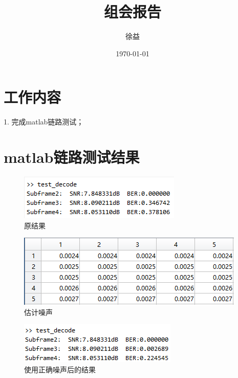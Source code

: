 \documentclass{article}
\title{组会报告}
\author{徐益}
\date{\today}
\begin{document}
\maketitle


\section{工作内容} 
1. 完成matlab链路测试；

\section{matlab链路测试结果}
\begin{figure}[H]
	\centering
	\includegraphics[width = .6\textwidth]{oldrst.png}
	\caption{原结果}
\end{figure}
\begin{figure}[H]
	\centering
	\includegraphics[width = .8\textwidth]{estn.png}
	\caption{估计噪声}
\end{figure}
\begin{figure}[H]
	\centering
	\includegraphics[width = .6\textwidth]{newrst.png}
	\caption{使用正确噪声后的结果}
\end{figure}

\end{document}
